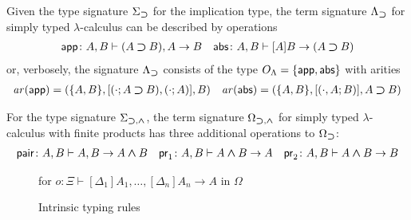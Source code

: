 \documentclass[acmsmall]{acmart}
\theoremstyle{acmdefinition}
\begin{document}
\begin{example} \label{ex:STLC-sig}
  Given the type signature $\Sigma_{\mathbin{\bm{\supset}}}$ for the implication type, the term signature $\Lambda_{\mathbin{\bm{\supset}}}$ for simply typed $\lambda$-calculus can be described by operations
  \begin{align*}
    \mathsf{app}\colon A, B \vdash (A \mathbin{\bm{\supset}} B), A \to B && \mathsf{abs}\colon A , B \vdash [A]B \to (A \mathbin{\bm{\supset}} B)
  \end{align*}
    or, verbosely, the signature $\Lambda_{\mathbin{\bm{\supset}}}$ consists of the type $O_\Lambda = \{\mathsf{app}, \mathsf{abs}\}$ with arities
  \begin{align*}
    \mathit{ar}(\mathsf{app}) = (\{A, B\}, [(\cdot; A \mathbin{\bm{\supset}} B), (\cdot; A)], B)
    && 
    \mathit{ar}(\mathsf{abs}) = (\{A, B\}, [(\cdot, A; B)], A \mathbin{\bm{\supset}} B)
  \end{align*}
\end{example}

\begin{example}\label{ex:STLCx-sig}
  For the type signature $\Sigma_{\mathbin{\bm{\supset}}, \mathbin{\bm{\wedge}}}$, the term signature $\Omega_{\mathbin{\bm{\supset}}, \mathbin{\bm{\wedge}}}$ for simply typed $\lambda$-calculus with finite products has three additional operations
to $\Omega_{\mathbin{\bm{\supset}}}$:
  \begin{align*}
    \mathsf{pair}\colon A, B \vdash A, B \to A \mathbin{\bm{\wedge}} B
    && \mathsf{pr}_{1} \colon A, B \vdash A \mathbin{\bm{\wedge}} B \to A
    && \mathsf{pr}_{2} \colon A, B \vdash A \mathbin{\bm{\wedge}} B \to B
  \end{align*}
\end{example}

\begin{figure}
  \centering
  \small
  for $o\colon \Xi \vdash [\Delta_1]A_1, \ldots, [\Delta_{n}]A_{n} \to A$ in $\Omega$
  \caption{Intrinsic typing rules}
\end{figure}
\end{document}
